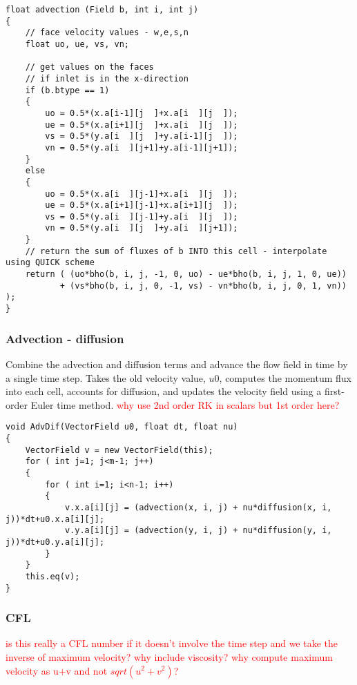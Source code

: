 \documentclass[notitlepage]{article}
\begin{document}
\begin{lstlisting}[style=myCpp]
float advection (Field b, int i, int j)
{
	// face velocity values - w,e,s,n
	float uo, ue, vs, vn;
	
	// get values on the faces
	// if inlet is in the x-direction
	if (b.btype == 1)
	{
		uo = 0.5*(x.a[i-1][j  ]+x.a[i  ][j  ]);
		ue = 0.5*(x.a[i+1][j  ]+x.a[i  ][j  ]);
		vs = 0.5*(y.a[i  ][j  ]+y.a[i-1][j  ]);
		vn = 0.5*(y.a[i  ][j+1]+y.a[i-1][j+1]);
	}
	else
	{
		uo = 0.5*(x.a[i  ][j-1]+x.a[i  ][j  ]);
		ue = 0.5*(x.a[i+1][j-1]+x.a[i+1][j  ]);
		vs = 0.5*(y.a[i  ][j-1]+y.a[i  ][j  ]);
		vn = 0.5*(y.a[i  ][j  ]+y.a[i  ][j+1]);
	}
	// return the sum of fluxes of b INTO this cell - interpolate using QUICK scheme
	return ( (uo*bho(b, i, j, -1, 0, uo) - ue*bho(b, i, j, 1, 0, ue))
		   + (vs*bho(b, i, j, 0, -1, vs) - vn*bho(b, i, j, 0, 1, vn)) );
}
\end{lstlisting}

\subsubsection{Advection - diffusion}

Combine the advection and diffusion terms and advance the flow field in time by
a single time step.
Takes the old velocity value, $u0$, computes the momentum flux into each cell,
accounts for diffusion, and updates the velocity field using a first-order
Euler time method.
\textcolor{red}{why use 2nd order RK in scalars but 1st order here?}

\begin{lstlisting}[style=myCpp]
void AdvDif(VectorField u0, float dt, float nu)
{
	VectorField v = new VectorField(this);
	for ( int j=1; j<m-1; j++)
	{
		for ( int i=1; i<n-1; i++)
		{
			v.x.a[i][j] = (advection(x, i, j) + nu*diffusion(x, i, j))*dt+u0.x.a[i][j];
			v.y.a[i][j] = (advection(y, i, j) + nu*diffusion(y, i, j))*dt+u0.y.a[i][j];
		}
	}
	this.eq(v);   
}
\end{lstlisting}

\subsubsection{CFL}

\textcolor{red}{is this really a CFL number if it doesn't involve the time step and
we take the inverse of maximum velocity? why include viscosity? why compute maximum
velocity as u+v and not $sqrt(u^2+v^2)$?}
\end{document}

